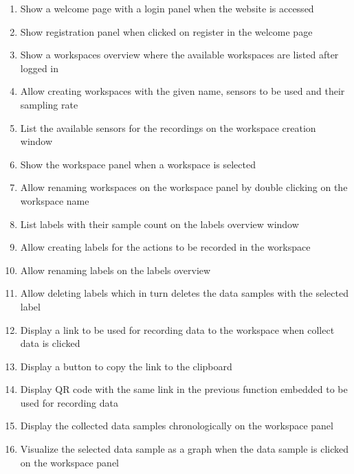 \begin{enumerate}[{label = \textbf{/F{\protect\twodigits{\arabic{enumi}}}0/}, leftmargin = *}]
    \item \label{itm:welcome-page}Show a welcome page with a login panel when the website is accessed
    \item \label{itm:registration-panel}Show registration panel when clicked on register in the welcome page
    \item \label{itm:workspaces-overview}Show a \glspl{workspace} overview where the available \glspl{workspace} are listed after logged in
    \item \label{itm:create-workspace}Allow creating \glspl{workspace} with the given name, sensors to be used and their sampling rate
    \item \label{itm:cr-list-sensors}List the available sensors for the recordings on the workspace creation window
    \item \label{itm:workspace-panel}Show the \gls{workspace} panel when a \gls{workspace} is selected
    \item \label{itm:rename-workspace}Allow renaming \glspl{workspace} on the \gls{workspace} panel by double clicking on the workspace name
    \item \label{itm:labels-overview}List labels with their sample count on the labels overview window
    \item \label{itm:create-label}Allow creating labels for the actions to be recorded in the workspace
    \item \label{itm:rename-label}Allow renaming labels on the labels overview
    \item \label{itm:delete-label}Allow deleting labels which in turn deletes the data samples with the selected label
    \item \label{itm:workspace-link}Display a link to be used for recording data to the workspace when collect data is clicked
    \item \label{itm:workspace-copy-link}Display a button to copy the link to the clipboard
    \item \label{itm:workspace-qr}Display QR code with the same link in the previous function embedded to be used for recording data
    \item \label{itm:display-samples}Display the collected data samples chronologically on the workspace panel
    \item \label{itm:visualize-sample}Visualize the selected data sample as a graph when the data sample is clicked on the workspace panel 

\end{enumerate}
